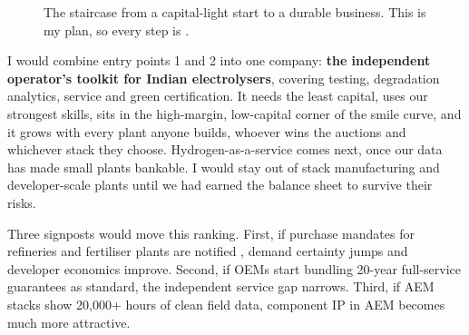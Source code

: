 \begin{figure}[H]
\centering
{}
\caption{The staircase from a capital-light start to a durable business. This is my plan, so every step is \prj.}
\end{figure}

\begin{verdict}
I would combine entry points 1 and 2 into one company: \textbf{the independent operator's toolkit for Indian electrolysers}, covering testing, degradation analytics, service and green certification. It needs the least capital, uses our strongest skills, sits in the high-margin, low-capital corner of the smile curve, and it grows with every plant anyone builds, whoever wins the auctions and whichever stack they choose. Hydrogen-as-a-service comes next, once our data has made small plants bankable. I would stay out of stack manufacturing and developer-scale plants until we had earned the balance sheet to survive their risks. \confM
\end{verdict}

\begin{plainwords}
Three signposts would move this ranking. First, if purchase mandates for refineries and fertiliser plants are notified \cite{xynteo2026}, demand certainty jumps and developer economics improve. Second, if OEMs start bundling 20-year full-service guarantees as standard, the independent service gap narrows. Third, if AEM stacks show 20,000+ hours of clean field data, component IP in AEM becomes much more attractive.
\end{plainwords}
